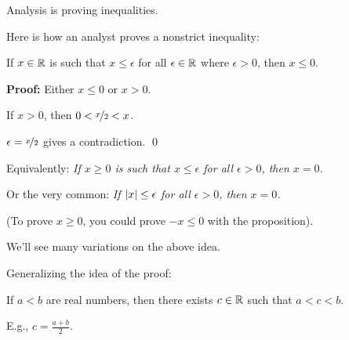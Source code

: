 \documentclass[10pt,aspectratio=169]{beamer}
\begin{document}
\begin{frame}
Analysis is proving inequalities.  

\pause

Here is how an analyst proves a nonstrict inequality:

\begin{proposition}
If $x \in {\mathbb{R}}$ is such that $x \leq \epsilon$ for all
$\epsilon \in {\mathbb{R}}$ where
$\epsilon > 0$, \pause then $x \leq 0$.
\end{proposition}

\pause

\textbf{Proof:}
Either $x \leq 0$ or $x > 0$.

\pause
If $x > 0$, then $0 < \nicefrac{x}{2} < x$.

\pause
$\epsilon = \nicefrac{x}{2}$ gives a contradiction.
\qed

\medskip
\pause

Equivalently:
\quad
\emph{If $x \geq 0$ is such that $x \leq \epsilon$ for all
$\epsilon > 0$, then $x = 0$.}

\medskip
\pause

Or the very common:
\quad
\emph{If $\left\lvert {x} \right\rvert \leq \epsilon$ for all
$\epsilon > 0$, then $x = 0$.}

\medskip
\pause

(To prove $x \geq 0$, you could prove $-x \leq 0$ with the proposition).

\medskip
\pause

We'll see many variations on the above idea.

\medskip
\pause

Generalizing the idea of the proof:

\pause

If $a < b$ are real numbers, then there
exists $c \in {\mathbb{R}}$ such that $a < c < b$.

\pause
E.g., 
$c = \frac{a+b}{2}$.
\end{frame}
\end{document}
